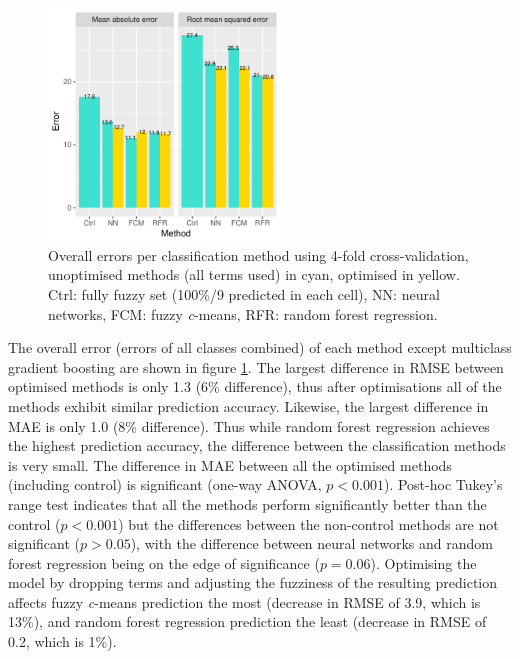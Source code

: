 \documentclass[a4paper,12pt]{scrbook}
\begin{document}
\begin{figure}
  \centering
  \includegraphics[width=0.55\textwidth]{thesis-figures/total-errors}
  \caption{Overall errors per classification method using 4-fold cross-validation, unoptimised methods (all terms used) in cyan, optimised in yellow. Ctrl: fully fuzzy set (100\%/9 predicted in each cell), NN: neural networks, FCM: fuzzy \textit{c}-means, RFR: random forest regression.}
  \label{fig-total-errors}
\end{figure}

The overall error (errors of all classes combined) of each method except multiclass gradient boosting are shown in figure \ref{fig-total-errors}. The largest difference in RMSE between optimised methods is only 1.3 (6\% difference), thus after optimisations all of the methods exhibit similar prediction accuracy. Likewise, the largest difference in MAE is only 1.0 (8\% difference). Thus while random forest regression achieves the highest prediction accuracy, the difference between the classification methods is very small. The difference in MAE between all the optimised methods (including control) is significant (one-way ANOVA, $p<0.001$). Post-hoc Tukey's range test indicates that all the methods perform significantly better than the control ($p<0.001$) but the differences between the non-control methods are not significant ($p>0.05$), with the difference between neural networks and random forest regression being on the edge of significance ($p=0.06$). Optimising the model by dropping terms and adjusting the fuzziness of the resulting prediction affects fuzzy \textit{c}-means prediction the most (decrease in RMSE of 3.9, which is 13\%), and random forest regression prediction the least (decrease in RMSE of 0.2, which is 1\%).
\end{document}
